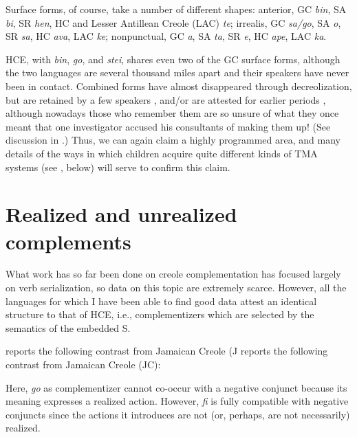 
Surface forms, of course, take a number of different shapes: 
anterior,
 GC \textit{bin}, 
 SA \textit{bi}, 
 SR \textit{hen}, 
 HC and Lesser Antillean Creole (LAC) \textit{te}; 
irrealis, 
 GC \textit{sa/go}, 
 SA \textit{o},
 SR \textit{sa}, 
 HC \textit{ava}, 
 LAC \textit{ke};
nonpunctual, 
 GC \textit{a}, 
 SA \textit{ta}, 
 SR \textit{e}, 
 HC \textit{ape}, 
 LAC \textit{ka}.

HCE, with \textit{bin}, \textit{go}, and \textit{stei}, shares even two of the GC surface forms, although the two languages are several thousand miles apart and their speakers have never been in contact. Combined forms have almost disappeared through decreolization, but are retained by a few speakers \citep{Bickerton1974}, and/or are attested for earlier periods \citep{Reinecke1969,Tsuzaki1971}, although nowadays those who remember them are so unsure of what they once meant that one investigator \citep{Perlman1973} accused his consultants of making them up! (See discussion in \citealt[183ff]{Bickerton1980}.) Thus, we can again claim a highly programmed area, and many details of the ways in which children acquire quite different kinds of TMA systems (see , below) will serve to confirm this claim.

\section{Realized and unrealized complements}

What work has so far been done on creole complementation has focused largely on verb serialization, so data on this topic are extremely scarce. However, all the languages for which I have been able to find good data attest an identical structure to that of HCE, i.e., complementizers which are selected by the semantics of the embedded S.

\citet{Roberts1975} reports the following contrast from Jamaican Creole (J reports the following contrast from Jamaican Creole (JC):

\z

\label{ex:2:28}\z
Here, \textit{go} as complementizer cannot co-occur with a negative conjunct because its meaning expresses a realized action. However, \textit{fi} is fully
compatible with negative conjuncts since the actions it introduces are not (or, perhaps, are not necessarily) realized.

